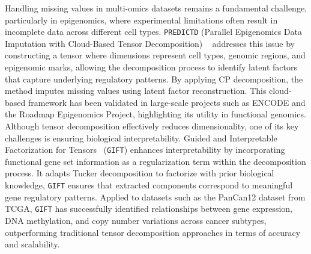 Handling missing values in multi-omics datasets remains a fundamental challenge, particularly in epigenomics, where experimental limitations often result in incomplete data across different cell types. \texttt{PREDICTD} (Parallel Epigenomics Data Imputation with Cloud-Based Tensor Decomposition)
~\cite{Durham2018PREDICTD} addresses this issue by constructing a tensor where dimensions represent cell types, genomic regions, and epigenomic marks, allowing the decomposition process to identify latent factors that capture underlying regulatory patterns. By applying CP decomposition, the method imputes missing values using latent factor reconstruction. This cloud-based framework has been validated in large-scale projects such as ENCODE and the Roadmap Epigenomics Project, highlighting its utility in functional genomics. Although tensor decomposition effectively reduces dimensionality, one of its key challenges is ensuring biological interpretability. Guided and Interpretable Factorization for Tensors~\cite{lee2018gift} (\texttt{GIFT}) enhances interpretability by incorporating functional gene set information as a regularization term within the decomposition process. It adapts Tucker decomposition to factorize with prior biological knowledge, \texttt{GIFT} ensures that extracted components correspond to meaningful gene regulatory patterns. Applied to datasets such as the PanCan12 dataset from TCGA, \texttt{GIFT} has successfully identified relationships between gene expression, DNA methylation, and copy number variations across cancer subtypes, outperforming traditional tensor decomposition approaches in terms of accuracy and scalability. 

